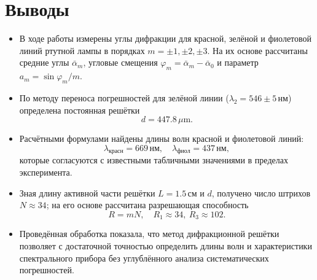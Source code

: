 \section*{Выводы}

\begin{itemize}
	\item В ходе работы измерены углы дифракции для красной, зелёной и фиолетовой линий ртутной лампы в порядках $m=\pm1,\pm2,\pm3$. На их основе рассчитаны средние углы $\bar\alpha_{m}$, угловые смещения $\varphi_{m}=\bar\alpha_{m}-\bar\alpha_{0}$ и параметр $a_m=\sin\varphi_m/m$.

	\item По методу переноса погрешностей для зелёной линии ($\lambda_2=546\pm5\,$нм) определена постоянная решётки
	      \[
		      d = 447.8\,\mu\mathrm{m}.
	      \]

	\item Расчётными формулами найдены длины волн красной и фиолетовой линий:
	      \[
		      \lambda_\mathrm{красн} = 669\,\mathrm{нм},
		      \quad
		      \lambda_\mathrm{фиол} = 437\,\mathrm{нм},
	      \]
	      которые согласуются с известными табличными значениями в пределах эксперимента.

	\item Зная длину активной части решётки $L=1.5\,$см и $d$, получено число штрихов $N\approx34$; на его основе рассчитана разрешающая способность
	      \[
		      R = mN,\quad R_1\approx34,\ R_3\approx102.
	      \]

	\item Проведённая обработка показала, что метод дифракционной решётки позволяет с достаточной точностью определить длины волн и характеристики спектрального прибора без углублённого анализа систематических погрешностей.
\end{itemize}
